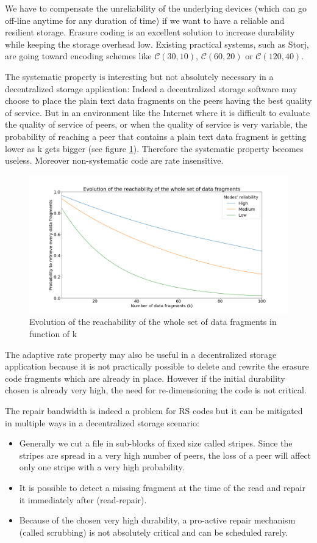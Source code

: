 \documentclass[oneside,9pt]{article}
\newcommand{\ec}[2]{ \mathcal{C}(#1, #2) }
\begin{document}
We have to compensate the unreliability of the underlying devices (which can go off-line anytime for any duration of time) if we want to have a reliable and resilient storage. Erasure coding is an excellent solution to increase durability while keeping the storage overhead low. Existing practical systems, such as Storj, are going toward encoding schemes like $\ec{30}{10}$, $\ec{60}{20}$ or $\ec{120}{40}$.

The systematic property is interesting but not absolutely necessary in a decentralized storage application: Indeed a decentralized storage software may choose to place the plain text data fragments on the peers having the best quality of service. But in an environment like the Internet where it is difficult to evaluate the quality of service of peers, or when the quality of service is very variable, the probability of reaching a peer that contains a plain text data fragment is getting lower as k gets bigger (see figure \ref{fig:systematic}). Therefore the systematic property becomes useless. Moreover non-systematic code are rate insensitive.

\begin{figure}[!h]
\centering
\includegraphics[width=0.7\columnwidth]{systematic.png}
\caption{Evolution of the reachability of the whole set of data fragments in function of k}
\label{fig:systematic}
\end{figure}

The adaptive rate property may also be useful in a decentralized storage application because it is not practically possible to delete and rewrite the erasure code fragments which are already in place. However if the initial durability chosen is already very high, the need for re-dimensioning the code is not critical.

The repair bandwidth is indeed a problem for RS codes but it can be mitigated in multiple ways in a decentralized storage scenario:
\begin{itemize}
\item Generally we cut a file in sub-blocks of fixed size called stripes. Since the stripes are spread in a very high number of peers, the loss of a peer will affect only one stripe with a very high probability.
\item It is possible to detect a missing fragment at the time of the read and repair it immediately after (read-repair).
\item Because of the chosen very high durability, a pro-active repair mechanism (called scrubbing) is not absolutely critical and can be scheduled rarely. 
\end{itemize}
\end{document}
